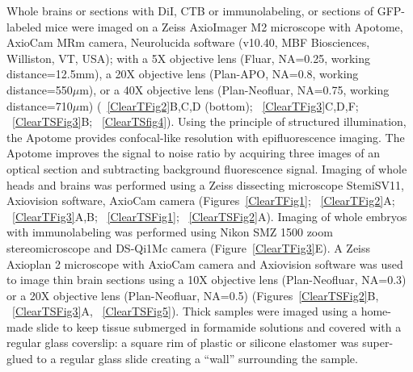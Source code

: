 Whole brains or sections with DiI, CTB or immunolabeling, or sections of GFP-labeled mice were imaged on a Zeiss AxioImager M2 microscope with Apotome, AxioCam MRm camera, Neurolucida software (v10.40, MBF Biosciences, Williston, VT, USA); with a 5X objective lens (Fluar, NA=0.25, working distance=12.5mm), a 20X objective lens (Plan-APO, NA=0.8, working distance=550$\mu$m), or a 40X objective lens (Plan-Neofluar, NA=0.75, working distance=710$\mu$m) (~\ref{ClearTFig2}B,C,D (bottom); ~\ref{ClearTFig3}C,D,F; ~\ref{ClearTSFig3}B; ~\ref{ClearTSfig4}).
Using the principle of structured illumination, the Apotome provides confocal-like resolution with epifluorescence imaging.
The Apotome improves the signal to noise ratio by acquiring three images of an optical section and subtracting background fluorescence signal.
Imaging of whole heads and brains was performed using a Zeiss dissecting microscope StemiSV11, Axiovision software, AxioCam camera (Figures~\ref{ClearTFig1}; ~\ref{ClearTFig2}A; ~\ref{ClearTFig3}A,B; ~\ref{ClearTSFig1}; ~\ref{ClearTSFig2}A).
Imaging of whole embryos with immunolabeling was performed using Nikon SMZ 1500 zoom stereomicroscope and DS-Qi1Mc camera (Figure~\ref{ClearTFig3}E).
A Zeiss Axioplan 2 microscope with AxioCam camera and Axiovision software was used to image thin brain sections using a 10X objective lens (Plan-Neofluar, NA=0.3) or a 20X objective lens (Plan-Neofluar, NA=0.5) (Figures~\ref{ClearTSFig2}B, ~\ref{ClearTSFig3}A, ~\ref{ClearTSFig5}).
Thick samples were imaged using a home-made slide to keep tissue submerged in formamide solutions and covered with a regular glass coverslip: a square rim of plastic or silicone elastomer was super-glued to a regular glass slide creating a ``wall'' surrounding the sample.
